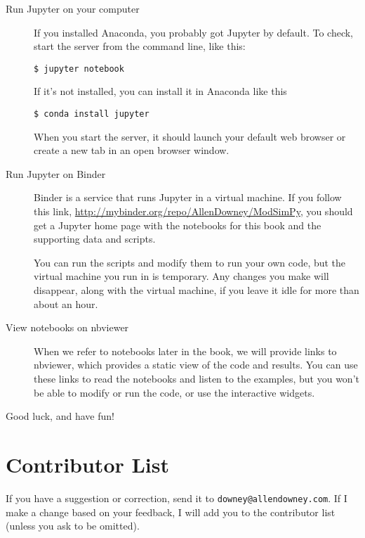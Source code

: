 \documentclass[12pt]{book}
\theoremstyle{exercise}
\begin{document}
\begin{description}

\item[Run Jupyter on your computer]

If you installed Anaconda, you
  probably got Jupyter by default.  To check, start the server from
the command line, like this:

\begin{verbatim}
$ jupyter notebook
\end{verbatim}

If it's not installed, you can install it in Anaconda like this

\begin{verbatim}
$ conda install jupyter
\end{verbatim}

When you start the server, it should launch your default web browser
or create a new tab in an open browser window.

\item[Run Jupyter on Binder]

Binder is a service that runs Jupyter in a virtual machine.  If you
follow this link, \url{http://mybinder.org/repo/AllenDowney/ModSimPy},
you should get a Jupyter home page with the notebooks for this book
and the supporting data and scripts.

You can run the scripts and modify them to run your own code, but the
virtual machine you run in is temporary.  Any changes you make will
disappear, along with the virtual machine, if you leave it idle for
more than about an hour.

\item[View notebooks on nbviewer]

When we refer to notebooks later in the book, we will provide links to
nbviewer, which provides a static view of the code and results.  You
can use these links to read the notebooks and listen to the examples,
but you won't be able to modify or run the code, or use the
interactive widgets.

\end{description}

Good luck, and have fun!



\section*{Contributor List}

If you have a suggestion or correction, send it to 
{\tt downey@allendowney.com}.  If I make a change based on your
feedback, I will add you to the contributor list
(unless you ask to be omitted).
\end{document}
